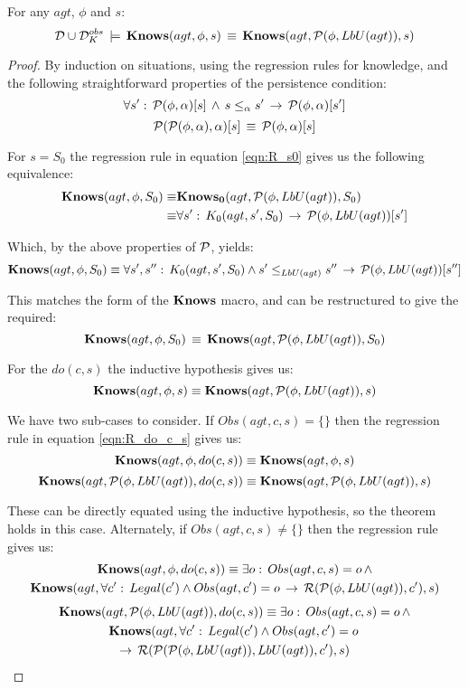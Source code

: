\begin{lemmaext}
[\ref{lem:Knows_impl_KnowsLbU}] For any $agt$, $\phi$ and
$s$:\[
\mathcal{D}\cup\mathcal{D}_{K}^{obs}\,\models\,\mathbf{Knows}(agt,\phi,s)\,\equiv\,\mathbf{Knows}(agt,\mathcal{P}(\phi,LbU(agt)),s)\]

\end{lemmaext}
\begin{proof}
By induction on situations, using the regression rules for knowledge,
and the following straightforward properties of the persistence condition:\[
\forall s':\,\mathcal{P}(\phi,\alpha)[s]\,\wedge\, s\leq_{\alpha}s'\,\rightarrow\,\mathcal{P}(\phi,\alpha)[s']\]
 \[
\mathcal{P}(\mathcal{P}(\phi,\alpha),\alpha)[s]\,\equiv\,\mathcal{P}(\phi,\alpha)[s]\]


For $s=S_{0}$ the regression rule in equation \eqref{eqn:R_s0} gives
us the following equivalence:\begin{align*}
\mathbf{Knows}(agt,\phi,S_{0})\equiv & \mathbf{Knows_{0}}(agt,\mathcal{P}(\phi,LbU(agt)),S_{0})\\
\equiv & \forall s':\, K_{0}(agt,s',S_{0})\,\rightarrow\,\mathcal{P}(\phi,LbU(agt))[s']\end{align*}


Which, by the above properties of $\mathcal{P}$, yields:\[
\mathbf{Knows}(agt,\phi,S_{0})\equiv\forall s',s'':\, K_{0}(agt,s',S_{0})\wedge s'\leq_{LbU(agt)}s''\,\rightarrow\,\mathcal{P}(\phi,LbU(agt))[s'']\]


This matches the form of the $\mathbf{Knows}$ macro, and can be restructured
to give the required:\[
\mathbf{Knows}(agt,\phi,S_{0})\,\equiv\,\mathbf{Knows}(agt,\mathcal{P}(\phi,LbU(agt)),S_{0})\]


For the $do(c,s)$ the inductive hypothesis gives us:\[
\mathbf{Knows}(agt,\phi,s)\equiv\mathbf{Knows}(agt,\mathcal{P}(\phi,LbU(agt)),s)\]


We have two sub-cases to consider. If $Obs(agt,c,s)=\{\}$ then the
regression rule in equation \eqref{eqn:R_do_c_s} gives us:\[
\mathbf{Knows}(agt,\phi,do(c,s))\equiv\mathbf{Knows}(agt,\phi,s)\]
 \[
\mathbf{Knows}(agt,\mathcal{P}(\phi,LbU(agt)),do(c,s))\equiv\mathbf{Knows}(agt,\mathcal{P}(\phi,LbU(agt)),s)\]


These can be directly equated using the inductive hypothesis, so the
theorem holds in this case. Alternately, if $Obs(agt,c,s)\neq\{\}$
then the regression rule gives us:\begin{multline*}
\mathbf{Knows}(agt,\phi,do(c,s))\equiv\exists o:\, Obs(agt,c,s)=o\,\wedge\\
\mathbf{Knows}(agt,\forall c':\, Legal(c')\wedge Obs(agt,c')=o\,\rightarrow\,\mathcal{R}(\mathcal{P}(\phi,LbU(agt)),c'),s)\end{multline*}
 \begin{multline*}
\mathbf{Knows}(agt,\mathcal{P}(\phi,LbU(agt)),do(c,s))\equiv\exists o:\, Obs(agt,c,s)=o\,\wedge\\
\mathbf{Knows}(agt,\forall c':\, Legal(c')\wedge Obs(agt,c')=o\,\\
\rightarrow\,\mathcal{R}(\mathcal{P}(\mathcal{P}(\phi,LbU(agt)),LbU(agt)),c'),s)\end{multline*}



\end{proof}
